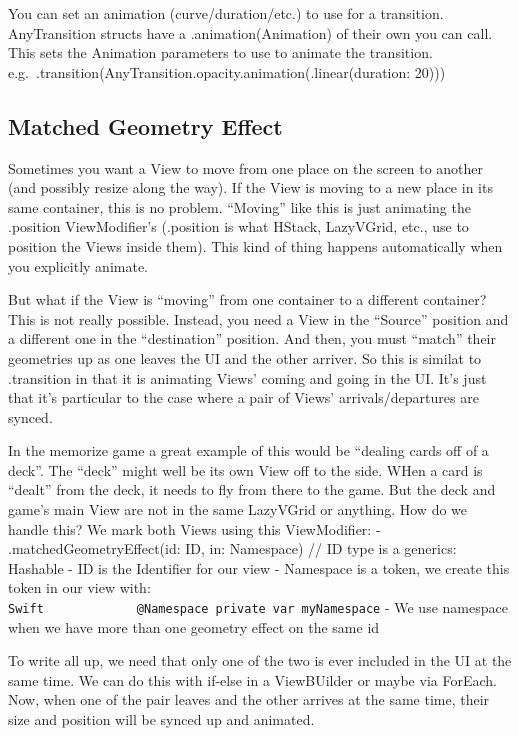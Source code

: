 \documentclass[]{article}
\begin{document}
You can set an animation (curve/duration/etc.) to use for a transition.
AnyTransition structs have a .animation(Animation) of their own you can
call. This sets the Animation parameters to use to animate the
transition.
e.g.~.transition(AnyTransition.opacity.animation(.linear(duration: 20)))

\hypertarget{matched-geometry-effect}{%
\subsection{Matched Geometry Effect}\label{matched-geometry-effect}}

Sometimes you want a View to move from one place on the screen to
another (and possibly resize along the way). If the View is moving to a
new place in its same container, this is no problem. ``Moving'' like
this is just animating the .position ViewModifier's (.position is what
HStack, LazyVGrid, etc., use to position the Views inside them). This
kind of thing happens automatically when you explicitly animate.

But what if the View is ``moving'' from one container to a different
container? This is not really possible. Instead, you need a View in the
``Source'' position and a different one in the ``destination'' position.
And then, you must ``match'' their geometries up as one leaves the UI
and the other arriver. So this is similat to .transition in that it is
animating Views' coming and going in the UI. It's just that it's
particular to the case where a pair of Views' arrivals/departures are
synced.

In the memorize game a great example of this would be ``dealing cards
off of a deck''. The ``deck'' might well be its own View off to the
side. WHen a card is ``dealt'' from the deck, it needs to fly from there
to the game. But the deck and game's main View are not in the same
LazyVGrid or anything. How do we handle this? We mark both Views using
this ViewModifier: - .matchedGeometryEffect(id: ID, in: Namespace) // ID
type is a generics: Hashable - ID is the Identifier for our view -
Namespace is a token, we create this token in our view with:
\texttt{Swift\ \ \ \ \ \ \ \ \ \ \ \ \ @Namespace\ private\ var\ myNamespace}
- We use namespace when we have more than one geometry effect on the
same id

To write all up, we need that only one of the two is ever included in
the UI at the same time. We can do this with if-else in a ViewBUilder or
maybe via ForEach. Now, when one of the pair leaves and the other
arrives at the same time, their size and position will be synced up and
animated.
\end{document}
